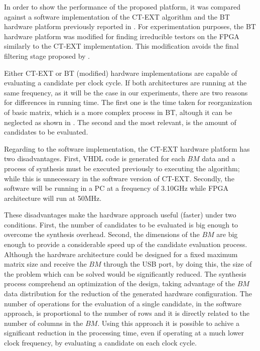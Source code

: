 \documentclass[authoryear,preprint,review,12pt]{elsarticle}
\begin{document}
In order to show the performance of the proposed platform, it was compared against a software 
implementation of the CT-EXT algorithm and the BT hardware platform previously reported in \citep{R21}. 
For experimentation purposes, the BT hardware platform was modified for finding irreducible testors 
on the FPGA similarly to the CT-EXT implementation. This modification avoids the final filtering stage 
proposed by \cite{R21}.

Either CT-EXT or BT (modified) hardware implementations are capable of evaluating a candidate per clock 
cycle. If both architectures are running at the same frequency, as it will be the case in our experiments, 
there are two reasons for differences in running time. The first one is the time taken for reorganization 
of basic matrix, which is a more complex process in BT, altough it can be neglected as shown in \citep{R21}. 
The second and the most relevant, is the amount of candidates to be evaluated. 

Regarding to the software implementation, the CT-EXT hardware platform has two disadvantages. First, 
VHDL code is generated for each $BM$ data and a process of synthesis must be executed previously to 
executing the algorithm; while this is unnecessary in the software version of CT-EXT. Secondly, the 
software will be running in a PC at a frequency of 3.10GHz while FPGA architecture will run at 50MHz. 

These disadvantages make the hardware approach useful (faster) under two conditions. First, the number of 
candidates to be evaluated is big enough to overcome the synthesis overhead. Second, the dimensions of the 
$BM$ are big enough to provide a considerable speed up of the candidate evaluation process. Although 
the hardware architecture could be designed for a fixed maximum matrix size and receive the $BM$ through the 
USB port, by doing this, the size of the problem which can be solved would be significantly reduced. The 
synthesis process comprehend an optimization of the design, taking advantage of the $BM$ data distribution for 
the reduction of the generated hardware configuration. The number of operations for the evaluation of a single 
candidate, in the software approach, is proportional to the number of rows and it is directly related to the 
number of columns in the $BM$. Using this approach it is possible to achive a significant reduction in the processing time, even if
operating at a much lower clock frequency, by evaluating a candidate on each clock cycle.
\end{document}
